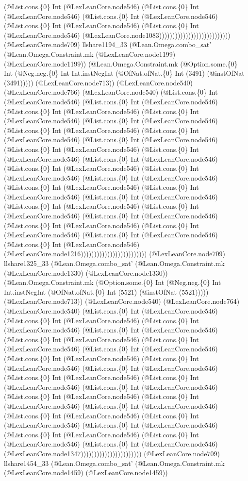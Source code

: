 \documentclass[11pt]{article}
\begin{document}
(@List.cons.\{0\} Int (@LexLeanCore.node546) (@List.cons.\{0\} Int (@LexLeanCore.node546) (@List.cons.\{0\} Int (@LexLeanCore.node546) (@List.cons.\{0\} Int (@LexLeanCore.node546) (@List.cons.\{0\} Int (@LexLeanCore.node546) (@LexLeanCore.node1083))))))))))))))))))))))))))) (@LexLeanCore.node709) llshare1194\_33 (@Lean.Omega.combo\_sat' (@Lean.Omega.Constraint.mk (@LexLeanCore.node1199) (@LexLeanCore.node1199)) (@Lean.Omega.Constraint.mk (@Option.some.\{0\} Int (@Neg.neg.\{0\} Int Int.instNegInt (@OfNat.ofNat.\{0\} Int (3491) (@instOfNat (3491))))) (@LexLeanCore.node713)) (@LexLeanCore.node540) (@LexLeanCore.node766) (@LexLeanCore.node540) (@List.cons.\{0\} Int (@LexLeanCore.node546) (@List.cons.\{0\} Int (@LexLeanCore.node546) (@List.cons.\{0\} Int (@LexLeanCore.node546) (@List.cons.\{0\} Int (@LexLeanCore.node546) (@List.cons.\{0\} Int (@LexLeanCore.node546) (@List.cons.\{0\} Int (@LexLeanCore.node546) (@List.cons.\{0\} Int (@LexLeanCore.node546) (@List.cons.\{0\} Int (@LexLeanCore.node546) (@List.cons.\{0\} Int (@LexLeanCore.node546) (@List.cons.\{0\} Int (@LexLeanCore.node546) (@List.cons.\{0\} Int (@LexLeanCore.node546) (@List.cons.\{0\} Int (@LexLeanCore.node546) (@List.cons.\{0\} Int (@LexLeanCore.node546) (@List.cons.\{0\} Int (@LexLeanCore.node546) (@List.cons.\{0\} Int (@LexLeanCore.node546) (@List.cons.\{0\} Int (@LexLeanCore.node546) (@List.cons.\{0\} Int (@LexLeanCore.node546) (@List.cons.\{0\} Int (@LexLeanCore.node546) (@List.cons.\{0\} Int (@LexLeanCore.node546) (@List.cons.\{0\} Int (@LexLeanCore.node546) (@List.cons.\{0\} Int (@LexLeanCore.node546) (@List.cons.\{0\} Int (@LexLeanCore.node546) (@List.cons.\{0\} Int (@LexLeanCore.node546) (@List.cons.\{0\} Int (@LexLeanCore.node546) (@LexLeanCore.node1216))))))))))))))))))))))))) (@LexLeanCore.node709) llshare1325\_33 (@Lean.Omega.combo\_sat' (@Lean.Omega.Constraint.mk (@LexLeanCore.node1330) (@LexLeanCore.node1330)) (@Lean.Omega.Constraint.mk (@Option.some.\{0\} Int (@Neg.neg.\{0\} Int Int.instNegInt (@OfNat.ofNat.\{0\} Int (5521) (@instOfNat (5521))))) (@LexLeanCore.node713)) (@LexLeanCore.node540) (@LexLeanCore.node764) (@LexLeanCore.node540) (@List.cons.\{0\} Int (@LexLeanCore.node546) (@List.cons.\{0\} Int (@LexLeanCore.node546) (@List.cons.\{0\} Int (@LexLeanCore.node546) (@List.cons.\{0\} Int (@LexLeanCore.node546) (@List.cons.\{0\} Int (@LexLeanCore.node546) (@List.cons.\{0\} Int (@LexLeanCore.node546) (@List.cons.\{0\} Int (@LexLeanCore.node546) (@List.cons.\{0\} Int (@LexLeanCore.node546) (@List.cons.\{0\} Int (@LexLeanCore.node546) (@List.cons.\{0\} Int (@LexLeanCore.node546) (@List.cons.\{0\} Int (@LexLeanCore.node546) (@List.cons.\{0\} Int (@LexLeanCore.node546) (@List.cons.\{0\} Int (@LexLeanCore.node546) (@List.cons.\{0\} Int (@LexLeanCore.node546) (@List.cons.\{0\} Int (@LexLeanCore.node546) (@List.cons.\{0\} Int (@LexLeanCore.node546) (@List.cons.\{0\} Int (@LexLeanCore.node546) (@List.cons.\{0\} Int (@LexLeanCore.node546) (@List.cons.\{0\} Int (@LexLeanCore.node546) (@List.cons.\{0\} Int (@LexLeanCore.node546) (@List.cons.\{0\} Int (@LexLeanCore.node546) (@List.cons.\{0\} Int (@LexLeanCore.node546) (@LexLeanCore.node1347))))))))))))))))))))))) (@LexLeanCore.node709) llshare1454\_33 (@Lean.Omega.combo\_sat' (@Lean.Omega.Constraint.mk (@LexLeanCore.node1459) (@LexLeanCore.node1459)) 
\end{document}
